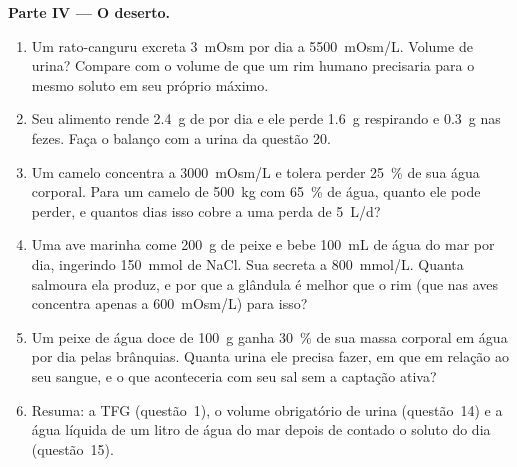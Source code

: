 \begin{problem}
\medskip
\noindent\textbf{Parte IV --- O deserto.}
\begin{enumerate}[resume]
  \item Um rato-canguru excreta \qty{3}{mOsm} por dia a
        \qty{5500}{mOsm/L}. Volume de urina? Compare com o volume de que
        um rim humano precisaria para o mesmo soluto em seu próprio
        máximo.
  \item Seu alimento rende \qty{2.4}{g} de  por dia e ele
        perde \qty{1.6}{g} respirando e \qty{0.3}{g} nas fezes. Faça o
        balanço com a urina da questão 20.
  \item Um camelo concentra a \qty{3000}{mOsm/L} e tolera perder
        \qty{25}{\%} de sua água corporal. Para um camelo de
        \qty{500}{kg} com \qty{65}{\%} de água, quanto ele pode perder, e
        quantos dias isso cobre a uma perda de \qty{5}{L/d}?
  \item Uma ave marinha come \qty{200}{g} de peixe e bebe \qty{100}{mL}
        de água do mar por dia, ingerindo \qty{150}{mmol} de NaCl. Sua
         secreta a \qty{800}{mmol/L}. Quanta salmoura ela
        produz, e por que a glândula é melhor que o rim (que nas aves
        concentra apenas a \qty{600}{mOsm/L}) para isso?
  \item Um peixe de água doce de \qty{100}{g} ganha \qty{30}{\%} de sua
        massa corporal em água por dia pelas brânquias. Quanta urina ele
        precisa fazer, em que  em relação ao seu sangue, e o
        que aconteceria com seu sal sem a captação ativa?
  \item Resuma: a TFG (questão~1), o volume obrigatório de urina
        (questão~14) e a água líquida de um litro de água do mar depois
        de contado o soluto do dia (questão~15).
\end{enumerate}
\end{problem}
